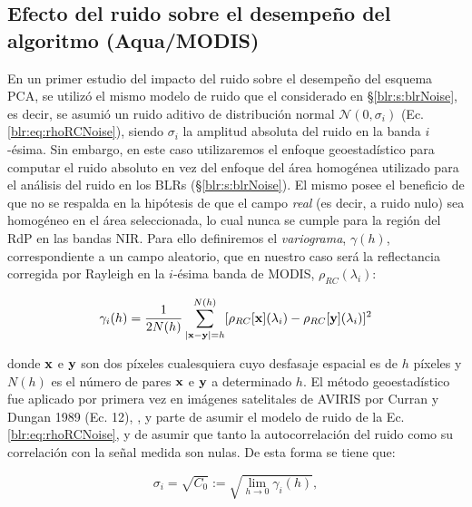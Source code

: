     \subsection{Efecto del ruido sobre el desempeño del algoritmo (Aqua/MODIS)}
    \label{pca:s:ruidoMetodos}
    
        En un primer estudio del impacto del ruido sobre el desempeño del esquema PCA, se utilizó el mismo modelo de ruido que el considerado en \S \ref{blr:s:blrNoise}, es decir, se asumió un ruido aditivo de distribución normal $\mathcal{N}(0,\sigma_{i})$ (Ec. \ref{blr:eq:rhoRCNoise}), siendo $\sigma_{i}$ la amplitud absoluta del ruido en la banda $i$-ésima. Sin embargo, en este caso utilizaremos el enfoque geoestadístico para computar el ruido absoluto en vez del enfoque del área homogénea utilizado para el análisis del ruido en los BLRs (\S \ref{blr:s:blrNoise}). El mismo posee el beneficio de que no se respalda en la hipótesis de que el campo \textit{real} (es decir, a ruido nulo) sea homogéneo en el área seleccionada, lo cual nunca se cumple para la región del RdP en las bandas NIR. Para ello definiremos el \textit{variograma}, $\gamma(h)$, correspondiente a un campo aleatorio, que en nuestro caso será la reflectancia corregida por Rayleigh en la $i$-ésima banda de MODIS, $\rho_{RC}(\lambda_{i})$:
        
        \begin{equation}
            \gamma_{i}(h) = \frac{1}{2N(h)}\sum_{|{\bf x} - {\bf y}|=h}^{N(h)} [\rho_{RC}[{\bf x}](\lambda_{i}) - \rho_{RC}[{\bf y}](\lambda_{i})]^{2}
            \label{pca:eq:variograma}
        \end{equation}

        \noindent donde ${\bf x}$ e ${\bf y}$ son dos píxeles cualesquiera cuyo desfasaje espacial es de $h$ píxeles y $N(h)$ es el número de pares ${\bf x}$ e ${\bf y}$ a determinado $h$. El método geoestadístico fue aplicado por primera vez en imágenes satelitales de AVIRIS por Curran y Dungan 1989 (Ec. 12), \cite{curran1989}, y parte de asumir el modelo de ruido de la Ec. \ref{blr:eq:rhoRCNoise}, y de asumir que tanto la autocorrelación del ruido como su correlación con la señal medida son nulas. De esta forma se tiene que:

        \begin{equation}
            \sigma_{i} = \sqrt{C_{0}} := \sqrt{\lim_{h\rightarrow 0}\gamma_{i}(h)},
            \label{pca:eq:nugget}
        \end{equation}

